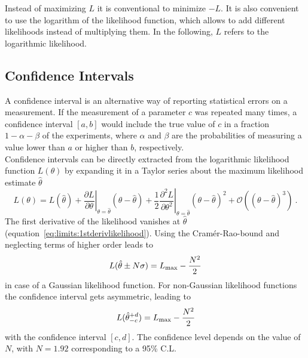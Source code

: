 Instead of maximizing $L$ it is conventional to minimize $-L$. It is also convenient to use the logarithm of the likelihood function, which allows to add different likelihoods instead of multiplying them. In the following, $L$ refers to the logarithmic likelihood.

\subsection{Confidence Intervals}
A confidence interval is an alternative way of reporting statistical errors on a measurement. If the measurement of a parameter $c$ was repeated many times, a confidence interval $[a,b]$ would include the true value of $c$ in a fraction $1-\alpha-\beta$ of the experiments, where $\alpha$ and $\beta$ are the probabilities of measuring a value lower than $a$ or higher than $b$, respectively.\\

Confidence intervals can be directly extracted from the logarithmic likelihood function $L(\theta)$ by expanding it in a Taylor series about the maximum likelihood estimate $\hat{\theta}$ \cite{cowan}
\begin{equation}
L(\theta) = L(\hat{\theta}) + \left. \frac{\partial L}{\partial \theta}\right|_{\theta=\hat{\theta}}(\theta-\hat{\theta}) + \frac{1}{2}\left.\frac{\partial^2L}{\partial \theta^2}\right|_{\theta=\hat{\theta}}(\theta-\hat{\theta})^2 + \mathcal{O}\left((\theta-\hat{\theta})^3\right) ~.
\label{eq:limits:liketaylor}
\end{equation}
The first derivative of the likelihood vanishes at $\hat{\theta}$ (equation~\ref{eq:limits:1stderivlikelihood}). Using the Cram\'{e}r-Rao-bound and neglecting terms of higher order leads to
\begin{equation}
L(\hat{\theta}\pm N\sigma) = L_{\rm max} - \frac{N^2}{2} 
\end{equation}
in case of a Gaussian likelihood function. For non-Gaussian likelihood functions the confidence interval gets asymmetric, leading to
\begin{equation}
L(\hat{\theta}_{-c}^{+d}) = L_{\rm max} - \frac{N^2}{2}
\end{equation}
with the confidence interval $[c,d]$. The confidence level depends on the value of $N$, with $N=1.92$ corresponding to a 95\% C.L.

